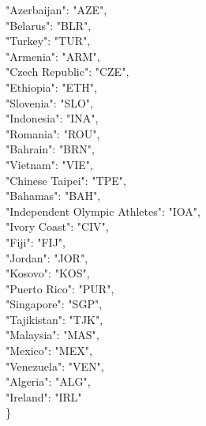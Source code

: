 \documentclass{mcmthesis}
\begin{document}
\begin{enumerate}
\begin{description}
"Azerbaijan": "AZE",\\
"Belarus": "BLR",\\
"Turkey": "TUR",\\
"Armenia": "ARM",\\
"Czech Republic": "CZE",\\
"Ethiopia": "ETH",\\
"Slovenia": "SLO",\\
"Indonesia": "INA",\\
"Romania": "ROU",\\
"Bahrain": "BRN",\\
"Vietnam": "VIE",\\
"Chinese Taipei": "TPE",\\
"Bahamas": "BAH",\\
"Independent Olympic Athletes": "IOA",\\
"Ivory Coast": "CIV",\\
"Fiji": "FIJ",\\
"Jordan": "JOR",\\
"Kosovo": "KOS",\\
"Puerto Rico": "PUR",\\
"Singapore": "SGP",\\
"Tajikistan": "TJK",\\
"Malaysia": "MAS",\\
"Mexico": "MEX",\\
"Venezuela": "VEN",\\
"Algeria": "ALG",\\
"Ireland": "IRL"\\
\}


\end{description}
\end{enumerate}
\end{document}
